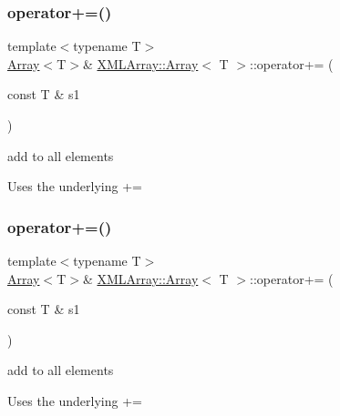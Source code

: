 \subsubsection{\texorpdfstring{operator+=()}{operator+=()}\hspace{0.1cm}{\footnotesize\ttfamily [4/6]}}
{\footnotesize\ttfamily template$<$typename T$>$ \\
\mbox{\hyperlink{classXMLArray_1_1Array}{Array}}$<$T$>$\& \mbox{\hyperlink{classXMLArray_1_1Array}{X\+M\+L\+Array\+::\+Array}}$<$ T $>$\+::operator+= (\begin{DoxyParamCaption}\item[{const T \&}]{s1 }\end{DoxyParamCaption})\hspace{0.3cm}{\ttfamily [inline]}}



add to all elements 

Uses the underlying += \mbox{\label{classXMLArray_1_1Array_ad3487cb84f2a45cc24ed06f5e96a62ee}} 
\subsubsection{\texorpdfstring{operator+=()}{operator+=()}\hspace{0.1cm}{\footnotesize\ttfamily [5/6]}}
{\footnotesize\ttfamily template$<$typename T$>$ \\
\mbox{\hyperlink{classXMLArray_1_1Array}{Array}}$<$T$>$\& \mbox{\hyperlink{classXMLArray_1_1Array}{X\+M\+L\+Array\+::\+Array}}$<$ T $>$\+::operator+= (\begin{DoxyParamCaption}\item[{const T \&}]{s1 }\end{DoxyParamCaption})\hspace{0.3cm}{\ttfamily [inline]}}



add to all elements 

Uses the underlying += \mbox{\label{classXMLArray_1_1Array_ad3487cb84f2a45cc24ed06f5e96a62ee}} 
